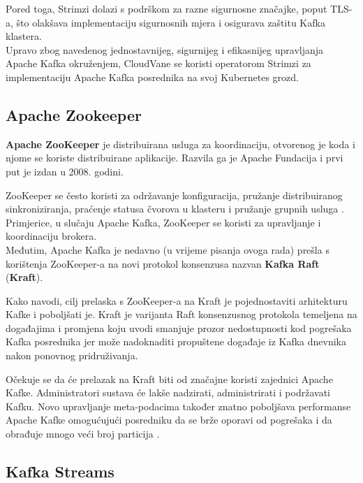 \documentclass[times, utf8, diplomski]{fer}
\begin{document}
Pored toga, Strimzi dolazi s podrškom za razne sigurnosne značajke, poput TLS-a, što olakšava implementaciju sigurnosnih mjera i osigurava zaštitu Kafka klastera.\\

Upravo zbog navedenog jednostavnijeg, sigurnijeg i efikasnijeg upravljanja Apache Kafka okruženjem, CloudVane se koristi operatorom Strimzi za implementaciju Apache Kafka posrednika na svoj Kubernetes grozd.

\subsection{Apache Zookeeper}

\textbf{Apache ZooKeeper} je distribuirana usluga za koordinaciju, otvorenog je koda i njome se koriste distribuirane aplikacije. Razvila ga je Apache Fundacija i prvi put je izdan u 2008. godini.

ZooKeeper se često koristi za održavanje konfiguracija, pružanje distribuiranog sinkroniziranja, praćenje statusa čvorova u klasteru i pružanje grupnih usluga \citep{hunt_zookeeper_2010}. Primjerice, u slučaju Apache Kafka, ZooKeeper se koristi za upravljanje i koordinaciju brokera.\\

Međutim, Apache Kafka je nedavno (u vrijeme pisanja ovoga rada) prešla s korištenja ZooKeeper-a na novi protokol konsenzusa nazvan \textbf{Kafka Raft} (\textbf{Kraft}).

Kako \citet{chandrakant_kafkas_2022} navodi, cilj prelaska s ZooKeeper-a na Kraft je pojednostaviti arhitekturu Kafke i poboljšati je. Kraft je varijanta Raft konsenzusnog protokola temeljena na događajima i promjena koju uvodi smanjuje prozor nedostupnosti kod pogrešaka Kafka posrednika jer može nadoknaditi propuštene događaje iz Kafka dnevnika nakon ponovnog pridruživanja. 

Očekuje se da će prelazak na Kraft biti od značajne koristi zajednici Apache Kafke. Administratori sustava će lakše nadzirati, administrirati i podržavati Kafku. Novo upravljanje meta-podacima također znatno poboljšava performanse Apache Kafke omogućujući posredniku da se brže oporavi od pogrešaka i da obrađuje mnogo veći broj particija \citep{chandrakant_kafkas_2022}.

\clearpage
\subsection{Kafka Streams}
\label{sec:kstream}
\end{document}
